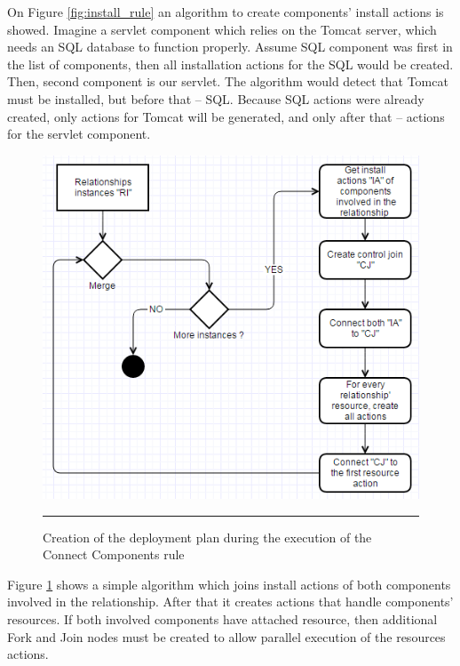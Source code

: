 \noindent

\noindent On Figure \ref{fig:install_rule} an algorithm to create components' install actions is showed. Imagine a servlet component which relies on the Tomcat server, which needs an SQL database to function properly. Assume SQL component was first in the list of components, then all installation actions for the SQL would be created. Then, second component is our servlet. The algorithm would detect that Tomcat must be installed, but before that -- SQL. Because SQL actions were already created, only actions for Tomcat will be generated, and only after that -- actions for the servlet component. 

\noindent 

\begin{figure}[htbp]
	\centering
		\includegraphics[width=38em]{./Figures/Connect_components}
		\rule{38em}{0.5pt}
	\caption[Connection Rule]{Creation of the deployment plan during the execution of the Connect Components rule}
	\label{fig:connect_rule}
\end{figure}

\noindent 

\noindent Figure \ref{fig:connect_rule} shows a simple algorithm which joins install actions of both components involved in the relationship. After that it creates actions that handle components' resources. If both involved components have attached resource, then additional Fork and Join nodes must be created to allow parallel execution of the resources actions.

